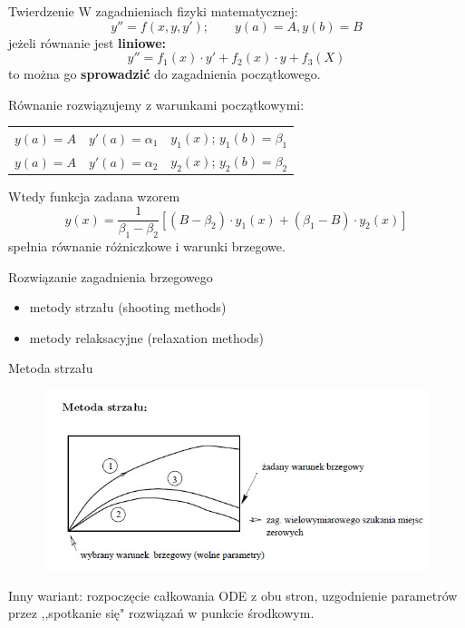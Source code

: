 \begin{frame}
	\begin{block}{Twierdzenie}
		W zagadnieniach fizyki matematycznej:
        $$y'' = f(x,y,y');\qquad y(a) = A, y(b) = B$$
        jeżeli równanie jest \textbf{liniowe:}
        $$y'' = f_1(x)\cdot y'+f_2(x)\cdot y + f_3(X)$$
        to można go \textbf{sprowadzić} do zagadnienia początkowego.
	\end{block}
\end{frame}
\begin{frame}
	Równanie rozwiązujemy z warunkami początkowymi:
    \begin{center}
    	\begin{tabular}{ccc}
    		$y(a) = A$ & $y'(a)=\alpha_1$ & $y_1(x)$;   $y_1(b) = \beta_1$\\
        	$y(a) = A$ & $y'(a)=\alpha_2$ & $y_2(x)$;   $y_2(b) = \beta_2$
    	\end{tabular}
    \end{center}
    Wtedy funkcja zadana wzorem
    $$y(x) = \frac{1}{\beta_1-\beta_2}[(B-\beta_2)\cdot y_1(x)+(\beta_1-B)\cdot y_2(x)]$$
    spełnia równanie różniczkowe i warunki brzegowe.\newline
    \begin{block}{Rozwiązanie zagadnienia brzegowego}
    	\begin{itemize}
          \item metody strzału (shooting methods)
          \item metody relaksacyjne (relaxation methods)
    	\end{itemize}
    \end{block}
\end{frame}
\begin{frame}{Metoda strzału}
	\begin{figure}
		\includegraphics[height=0.55\textheight]{img/22/strzal.jpg}
	\end{figure} 
    Inny wariant:\newline
    \qquad rozpoczęcie całkowania ODE z obu stron, uzgodnienie parametrów przez ,,spotkanie się" rozwiązań w punkcie środkowym.
\end{frame}
